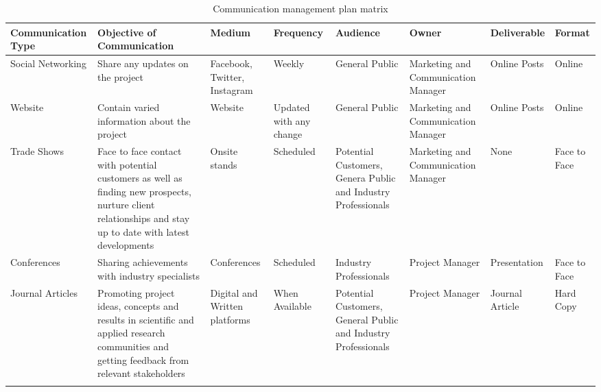 \begin{landscape}
	
	
	\begin{longtable}{| >{\raggedright\arraybackslash}p{2.8cm}  | >{\raggedright\arraybackslash}p{2.8cm} | >{\raggedright\arraybackslash}p{2cm} | >{\raggedright\arraybackslash}p{2cm} | >{\raggedright\arraybackslash}p{2cm} | >{\raggedright\arraybackslash}p{2.4cm} | >{\raggedright\arraybackslash}p{2.4cm} | >{\raggedright\arraybackslash}p{2.4cm} |  }
		
		
		\toprule [2pt]
		
		\textbf{Communication Type} & \textbf{Objective of Communication} & \textbf{Medium}  &\textbf{Frequency} &\textbf{Audience}& \textbf{Owner}& \textbf{Deliverable} &\textbf{Format} \\  
		
		\midrule [1.5pt]
		\endhead
		
		Social Networking& Share any updates on the project  & Facebook, Twitter, Instagram   &Weekly   &General Public     &  Marketing and Communication Manager &Online Posts   &Online\\  
		
		\hline
		
		Website& Contain varied information about the project  &   Website &Updated with any change   &  General Public   &  Marketing and Communication Manager & Online Posts  &Online\\  
		
		\hline
		
		Trade Shows&Face to face contact with potential customers as well as finding new prospects, nurture client relationships and stay up to date with latest developments   &  Onsite stands  & Scheduled  &  Potential Customers, Genera Public and Industry Professionals   &Marketing and Communication Manager   & None  &Face to Face\\  
		
		\hline
		
		Conferences& Sharing achievements with industry specialists  &  Conferences  &Scheduled   & Industry Professionals    & Project Manager  & Presentation  &Face to Face\\  
		
		\hline
		
		Journal Articles&Promoting project ideas, concepts and results in scientific and applied research communities and getting feedback from relevant stakeholders   &Digital and Written platforms    &  When Available &  Potential Customers, General Public and Industry Professionals   & Project Manager  & Journal Article  &Hard Copy\\  
		
		\bottomrule[2pt]
		
		
		\caption{Communication management plan matrix}
	\end{longtable}
	
	\vspace*{\fill}
	
	
\end{landscape}
